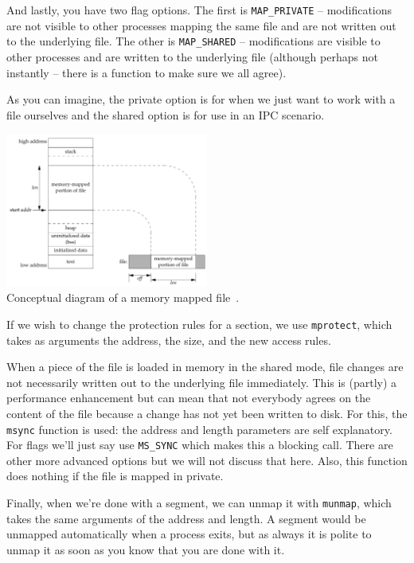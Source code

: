 \documentclass[a4paper]{report}
\begin{document}
And lastly, you have two flag options. The first is \texttt{MAP\_PRIVATE} -- modifications are not visible to other processes mapping the same file and are not written out to the underlying file. The other is \texttt{MAP\_SHARED} -- modifications are visible to other processes and are written to the underlying file (although perhaps not instantly -- there is a function to make sure we all agree).

As you can imagine, the private option is for when we just want to work with a file ourselves and the shared option is for use in an IPC scenario.

\begin{center}
	\includegraphics[width=0.5\textwidth]{images/memory-mapped-file.png}\\
	Conceptual diagram of a memory mapped file~\cite{apunix}.
\end{center}

If we wish to change the protection rules for a section, we use \texttt{mprotect}, which takes as arguments the address, the size, and the new access rules.

When a piece of the file is loaded in memory in the shared mode, file changes are not necessarily written out to the underlying file immediately. This is (partly) a performance enhancement but can mean that not everybody agrees on the content of the file because a change has not yet been written to disk. For this, the \texttt{msync} function is used: the address and length parameters are self explanatory. For flags we'll just say use \texttt{MS\_SYNC} which makes this a blocking call. There are other more advanced options but we will not discuss that here. Also, this function does nothing if the file is mapped in private.

Finally, when we're done with a segment, we can unmap it with \texttt{munmap}, which takes the same arguments of the address and length. A segment would be unmapped automatically when a process exits, but as always it is polite to unmap it as soon as you know that you are done with it.
\end{document}
